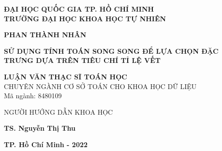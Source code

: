 \newpage
\begin{center}
{\bf  ĐẠI HỌC QUỐC GIA TP. HỒ CHÍ MINH}\\
{\bf TRƯỜNG ĐẠI HỌC KHOA HỌC TỰ NHIÊN}

\vspace*{1.5cm}

{\bf  PHAN THÀNH NHÂN}

\vspace*{1.5cm}

{\LARGE\bf SỬ DỤNG TÍNH TOÁN SONG SONG ĐỂ LỰA CHỌN ĐẶC TRƯNG DỰA TRÊN TIÊU CHÍ TỈ LỆ VẾT	}

\vspace*{1.5cm}

{\bf LUẬN VĂN THẠC SĨ TOÁN HỌC}\\[20pt]
CHUYÊN NGÀNH CƠ SỞ TOÁN CHO KHOA HỌC DỮ LIỆU\\[10pt]
Mã ngành: 8480109

\vspace*{3cm}

NGƯỜI HƯỚNG DẪN KHOA HỌC

{\bf TS. Nguyễn Thị Thu}

\vfill
\thispagestyle{empty}
{\bf TP. Hồ Chí Minh - 2022}
\end{center}

